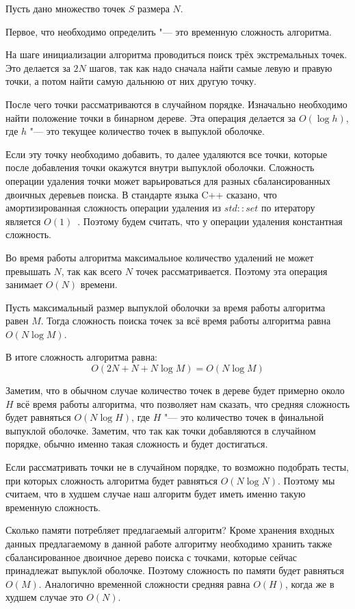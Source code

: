 Пусть дано множество точек $S$ размера $N$.

Первое, что необходимо определить "--- это временную сложность алгоритма.

На шаге инициализации алгоритма проводиться поиск трёх экстремальных точек. Это делается за $2 N$ шагов, так как надо сначала найти самые левую и правую точки, а потом найти самую дальнюю от них другую точку.

После чего точки рассматриваются в случайном порядке. Изначально необходимо найти положение точки в бинарном дереве. Эта операция делается за $O(\log h)$, где $h$ "--- это текущее количество точек в выпуклой оболочке.

Если эту точку необходимо добавить, то далее удаляются все точки, которые после добавления точки окажутся внутри выпуклой оболочки. Сложность операции удаления точки может варьироваться для разных сбалансированных двоичных деревьев поиска. В стандарте языка C++ сказано, что амортизированная сложность операции удаления из $std::set$ по итератору является $O(1)$~\cite{isoCppStd2017}. Поэтому будем считать, что у операции удаления константная сложность.

Во время работы алгоритма максимальное количество удалений не может превышать $N$, так как всего $N$ точек рассматривается. Поэтому эта операция занимает $O(N)$ времени.

Пусть максимальный размер выпуклой оболочки за время работы алгоритма равен $M$. Тогда сложность поиска точек за всё время работы алгоритма равна $O(N \log M)$.

В итоге сложность алгоритма равна:
\[
O(2 N + N + N \log M) = O(N \log M)
\]

Заметим, что в обычном случае количество точек в дереве будет примерно около $H$ всё время работы алгоритма, что позволяет нам сказать, что средняя сложность будет равняться $O(N \log H)$, где $H$ "--- это количество точек в финальной выпуклой оболочке. Заметим, что так как точки добавляются в случайном порядке, обычно именно такая сложность и будет достигаться. 

Если рассматривать точки не в случайном порядке, то возможно подобрать тесты, при которых сложность алгоритма будет равняться $O(N \log N)$. Поэтому мы считаем, что в худшем случае наш алгоритм будет иметь именно такую временную сложность. 

Сколько памяти потребляет предлагаемый алгоритм? Кроме хранения входных данных предлагаемому в данной работе алгоритму необходимо хранить также сбалансированное двоичное дерево поиска с точками, которые сейчас принадлежат выпуклой оболочке. Поэтому сложность по памяти будет равняться $O(M)$. Аналогично временной сложности средняя равна $O(H)$, когда же в худшем случае это $O(N)$.

